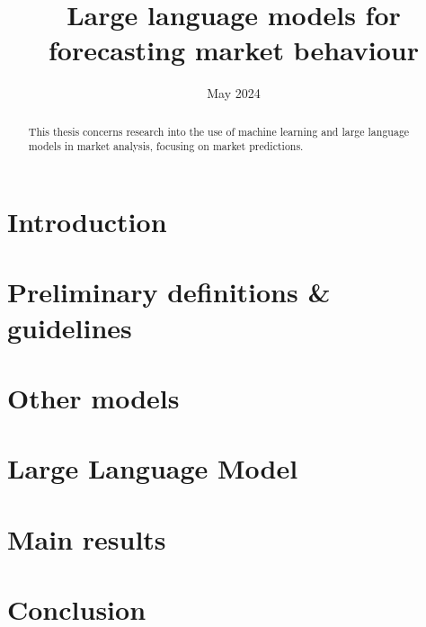 \documentclass[licencjacka, en]{pracamgr}
\title{Large language models for forecasting market behaviour}
\date{May 2024}
\begin{document}
\newcommand{\rozdzial}[2]{
	\chapter{#1}
	\label{chap:#2}
	
}

\maketitle

\begin{abstract}
	This thesis concerns research into the use of machine learning
	and large language models in market analysis, focusing on market
	predictions.
\end{abstract}

\tableofcontents

\rozdzial{Introduction}{introduction}
\rozdzial{Preliminary definitions \& guidelines}{preliminary-definitions}
\rozdzial{Other models}{other-models}
\rozdzial{Large Language Model}{large-language-model}
\rozdzial{Main results}{results}
\rozdzial{Conclusion}{conclusion}
\appendix

\end{document}
